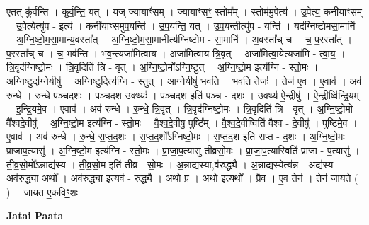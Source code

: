 \documentclass[17pt]{extarticle}
\begin{document}
ए॒तत् कु॑र्वन्ति । कु॒र्व॒न्ति॒ यत् । यज् ज्यायाꣳ॑सम् । ज्यायाꣳ॑सꣳ॒॒ स्तोम᳚म् । स्तोम॑मु॒पेत्य॑ । उ॒पेत्य॒ कनी॑याꣳसम् । उ॒पेत्येत्यु॑प - इत्य॑ । कनी॑याꣳसमुप॒यन्ति॑ । उ॒प॒यन्ति॒ यत् । उ॒प॒यन्तीत्यु॑प - यन्ति॑ । यद॑ग्निष्टोमसा॒मानि॑ । अ॒ग्नि॒ष्टो॒म॒सा॒मान्य॒वस्ता᳚त् । अ॒ग्नि॒ष्टो॒म॒सा॒मानीत्य॑ग्निष्टोम - सा॒मानि॑ । अ॒वस्ता᳚च् च । च॒ प॒रस्ता᳚त् । प॒रस्ता᳚च् च । च॒ भव॑न्ति । भव॒न्त्यजा॑मित्वाय । अजा॑मित्वाय त्रि॒वृत् । अजा॑मित्वा॒येत्यजा॑मि - त्वा॒य॒ । त्रि॒वृद॑ग्निष्टो॒मः । त्रि॒वृदिति॑ त्रि - वृत् । अ॒ग्नि॒ष्टो॒मो᳚ऽग्नि॒ष्टुत् । अ॒ग्नि॒ष्टो॒म इत्य॑ग्नि - स्तो॒मः । अ॒ग्नि॒ष्टुदा᳚ग्ने॒यीषु॑ । अ॒ग्नि॒ष्टुदित्य॑ग्नि - स्तुत् । आ॒ग्ने॒यीषु॑ भवति । भ॒व॒ति॒ तेजः॑ । तेज॑ ए॒व । ए॒वाव॑ । अव॑ रुन्धे । रु॒न्धे॒ प॒ञ्च॒द॒शः । प॒ञ्च॒द॒श उ॒क्थ्यः॑ । प॒ञ्च॒द॒श इति॑ पञ्च - द॒शः । उ॒क्थ्य॑ ऐ॒न्द्रीषु॑ । ऐ॒न्द्रीष्वि॑न्द्रि॒यम् । इ॒न्द्रि॒यमे॒व । ए॒वाव॑ । अव॑ रुन्धे । रु॒न्धे॒ त्रि॒वृत् । त्रि॒वृद॑ग्निष्टो॒मः । त्रि॒वृदिति॑ त्रि - वृत् । अ॒ग्नि॒ष्टो॒मो वै᳚श्वदे॒वीषु॑ । अ॒ग्नि॒ष्टो॒म इत्य॑ग्नि - स्तो॒मः । वै॒श्व॒दे॒वीषु॒ पुष्टि᳚म् । वै॒श्व॒दे॒वीष्विति॑ वैश्व - दे॒वीषु॑ । पुष्टि॑मे॒व । ए॒वाव॑ । अव॑ रुन्धे । रु॒न्धे॒ स॒प्त॒द॒शः । स॒प्त॒द॒शो᳚ऽग्निष्टो॒मः । स॒प्त॒द॒श इति॑ सप्त - द॒शः । अ॒ग्नि॒ष्टो॒मः प्रा॑जाप॒त्यासु॑ । अ॒ग्नि॒ष्टो॒म इत्य॑ग्नि - स्तो॒मः । प्रा॒जा॒प॒त्यासु॑ तीव्रसो॒मः । प्रा॒जा॒प॒त्यास्विति॑ प्राजा - प॒त्यासु॑ । ती॒व्र॒सो॒मो᳚ऽन्नाद्य॑स्य । ती॒व्र॒सो॒म इति॑ तीव्र - सो॒मः । अ॒न्नाद्य॒स्या,व॑रुद्ध्यै । अ॒न्नाद्य॒स्येत्य॑न्न - अद्य॑स्य । अव॑रुद्ध्या॒ अथो᳚ । अव॑रुद्ध्या॒ इत्यव॑ - रु॒द्ध्यै॒ । अथो॒ प्र । अथो॒ इत्यथो᳚ । प्रैव । ए॒व तेन॑ । तेन॑ जायते ( ) । जा॒य॒त॒ ए॒क॒विꣳ॒॒शः \newline

\textbf{Jatai Paata} \newline
\end{document}
